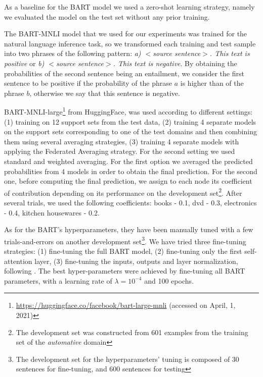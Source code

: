 \documentclass{esannV2}
\begin{document}
    As a baseline for the BART model we used a zero-shot learning strategy, namely we evaluated the model on the test set without any prior training. 
    
    The BART-MNLI model that we used for our experiments was trained for the natural language inference task, so we transformed each training and test sample into two phrases of the following pattern: \textit{a) $<$source sentence$>$. This text is positive} or \textit{b) $<$source sentence$>$. This text is negative}. By obtaining the probabilities of the second sentence being an entailment, we consider the first sentence to be positive if the probability of the phrase $a$ is higher than of the phrase $b$, otherwise we say that this sentence is negative.
    
    BART-MNLI-large\footnote{\url{https://huggingface.co/facebook/bart-large-mnli} (accessed on April, 1, 2021)} from HuggingFace, was used according to different settings: (1) training on 12 support sets from the test data, (2) training 4 separate models on the support sets corresponding to one of the test domains and then combining them using several averaging strategies, (3) training 4 separate models with applying the Federated Averaging strategy\cite{fedavg}. %
    For the second setting we used standard and weighted averaging. For the first option we averaged the predicted probabilities from 4 models in order to obtain the final prediction. For the second one, before computing the final prediction, we assign to each node its coefficient of contribution depending on its performance on the development set\footnote{The development set was constructed from 601 examples from the training set of the \textit{automative} domain}. After several trials, we used the following coefficients: books - 0.1, dvd - 0.3, electronics - 0.4, kitchen housewares - 0.2.
    
    As for the BART's hyperparameters, they have been manually tuned with a few trials-and-errors on another development set\footnote{The development set for the hyperparameters' tuning is composed of 30 sentences for fine-tuning, and 600 sentences for testing}. We have tried three fine-tuning strategies: (1) fine-tuning the full BART model, (2) fine-tuning only the first self-attention layer, (3) fine-tuning the inputs, outputs and layer normalization, following \cite{lu2021pretrained}. The best hyper-parameters were achieved by fine-tuning all BART parameters, with a learning rate of $\lambda = 10^{-4}$ and 100 epochs.
        
\end{document}

